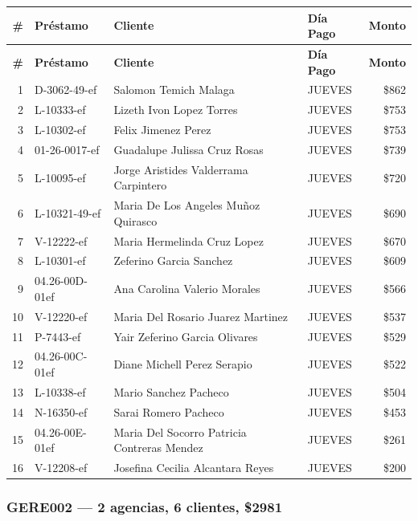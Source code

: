 \documentclass[11pt,a4paper]{article}
\newcommand{\money}[1]{\$\num{#1}}
\begin{document}
\begin{center}
\renewcommand{\arraystretch}{1.1}
\footnotesize
\begin{longtable}{rlp{6.5cm}lr}
\toprule
\textbf{\#} & \textbf{Pr\'estamo} & \textbf{Cliente} & \textbf{D\'ia Pago} & \textbf{Monto} \\
\midrule
\endfirsthead
\toprule
\textbf{\#} & \textbf{Pr\'estamo} & \textbf{Cliente} & \textbf{D\'ia Pago} & \textbf{Monto} \\
\midrule
\endhead
1 & D-3062-49-ef & Salomon Temich Malaga & JUEVES & \money{862} \\
2 & L-10333-ef & Lizeth Ivon Lopez Torres & JUEVES & \money{753} \\
3 & L-10302-ef & Felix Jimenez Perez & JUEVES & \money{753} \\
4 & 01-26-0017-ef & Guadalupe Julissa Cruz Rosas & JUEVES & \money{739} \\
5 & L-10095-ef & Jorge Aristides Valderrama Carpintero & JUEVES & \money{720} \\
6 & L-10321-49-ef & Maria De Los Angeles Muñoz Quirasco & JUEVES & \money{690} \\
7 & V-12222-ef & Maria Hermelinda Cruz Lopez & JUEVES & \money{670} \\
8 & L-10301-ef & Zeferino Garcia Sanchez & JUEVES & \money{609} \\
9 & 04.26-00D-01ef & Ana Carolina Valerio Morales & JUEVES & \money{566} \\
10 & V-12220-ef & Maria Del Rosario Juarez Martinez & JUEVES & \money{537} \\
11 & P-7443-ef & Yair Zeferino Garcia Olivares & JUEVES & \money{529} \\
12 & 04.26-00C-01ef & Diane Michell Perez Serapio & JUEVES & \money{522} \\
13 & L-10338-ef & Mario Sanchez Pacheco & JUEVES & \money{504} \\
14 & N-16350-ef & Sarai Romero Pacheco & JUEVES & \money{453} \\
15 & 04.26-00E-01ef & Maria Del Socorro Patricia Contreras Mendez & JUEVES & \money{261} \\
16 & V-12208-ef & Josefina Cecilia Alcantara Reyes & JUEVES & \money{200} \\

\bottomrule
\end{longtable}
\end{center}
\subsubsection{GERE002 --- 2 agencias, 6 clientes, \money{2981}}
\end{document}
